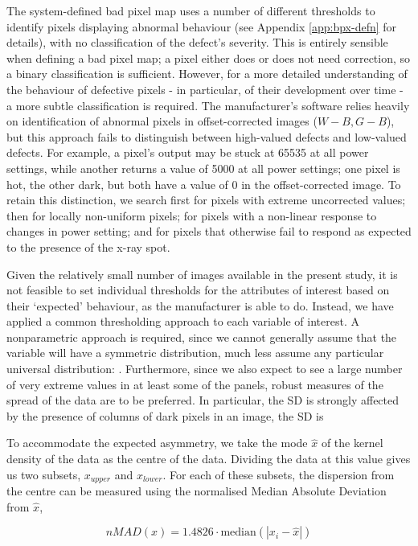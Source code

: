 \documentclass[\main/IO-Pixels.tex]{subfiles}
\begin{document}
The system-defined bad pixel map uses a number of different thresholds to identify pixels displaying abnormal behaviour (see Appendix \ref{app:bpx-defn} for details), with no classification of the defect's severity. This is entirely sensible when defining a bad pixel map; a pixel either does or does not need correction, so a binary classification is sufficient. However, for a more detailed understanding of the behaviour of defective pixels - in particular, of their development over time - a more subtle classification is required. The manufacturer's software relies heavily on identification of abnormal pixels in offset-corrected images ($W-B, G-B$), but this approach fails to distinguish between high-valued defects and low-valued defects. For example, a pixel's output may be stuck at 65535 at all power settings, while another returns a value of 5000 at all power settings; one pixel is hot, the other dark, but both have a value of 0 in the offset-corrected image. To retain this distinction, we search first for pixels with extreme uncorrected values; then for locally non-uniform pixels; for pixels with a non-linear response to changes in power setting; and for pixels that otherwise fail to respond as expected to the presence of the x-ray spot.

Given the relatively small number of images available in the present study, it is not feasible to set individual thresholds for the attributes of interest based on their `expected' behaviour, as the manufacturer is able to do. Instead, we have applied a common thresholding approach to each variable of interest. A nonparametric approach is required, since we cannot generally assume that the variable will have a symmetric distribution, much less assume any particular universal distribution: . Furthermore, since we also expect to see a large number of very extreme values in at least some of the panels, robust measures of the spread of the data are to be preferred. In particular, the SD is strongly affected by the presence of columns of dark pixels in an image, the SD is 

To accommodate the expected asymmetry, we take the mode $\hat{x}$ of the kernel density of the data as the centre of the data. Dividing the data at this value gives us two subsets, $x_{upper}$ and $x_{lower}$. For each of these subsets, the dispersion from the centre can be measured using the normalised Median Absolute Deviation from $\hat{x}$, 

\begin{equation}
    nMAD(x) = 1.4826 \cdot \text{median}(|x_i - \hat{x}|)
\end{equation}
\end{document}
